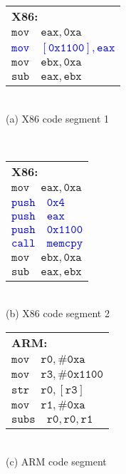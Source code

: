 \begin{figure}[tb]
\begin{minipage}{0.5\linewidth}
\centering
\scriptsize
\begin{tabular}{|l|} \hline
\textbf{X86:} \\
$\mathtt{mov\quad eax, 0xa}$\\
\textcolor{blue}{$\mathtt{mov\quad[0x1100], eax}$}\\
$\mathtt{mov\quad ebx, 0xa}$\\
$\mathtt{sub\quad eax, ebx}$ \\
\hline
\end{tabular}
\\[0.2cm] (a) X86 code segment 1 \label{fig:emulation:a}
\end{minipage}
~
\begin{minipage}{0.5\linewidth}
\centering
\scriptsize
\begin{tabular}{|l|} \hline
\textbf{X86:} \\
$\mathtt{mov\quad eax, 0xa}$\\
\textcolor{blue}{$\mathtt{push\quad 0x4}$}\\
\textcolor{blue}{$\mathtt{push\quad eax}$}\\
\textcolor{blue}{$\mathtt{push\quad 0x1100}$}\\
\textcolor{blue}{$\mathtt{call\quad memcpy}$}\\
$\mathtt{mov\quad ebx, 0xa}$ \\
$\mathtt{sub\quad eax, ebx}$ \\
\hline
\end{tabular}
\label{fig:emulation:b}
\\[0.1cm] (b) X86 code segment 2
\end{minipage}
\begin{minipage}{0.5\linewidth}
\centering
\scriptsize
\begin{tabular}{|l|} \hline
\textbf{ARM:} \\
$\mathtt{mov\quad r0, \#0xa}$\\
$\mathtt{mov\quad r3, \#0x1100}$\\
$\mathtt{str\quad  r0,[r3]}$\\
$\mathtt{mov\quad r1, \#0xa}$ \\
$\mathtt{subs\quad r0,r0,r1}$ \\
\hline
\end{tabular}
\\[0.2cm] (c)  ARM code segment \label{fig:emulation:c}
\end{minipage}
~
\begin{minipage}{0.5\linewidth}
\centering
\scriptsize
 \vspace{2mm}
 \begin{tabular}{l}


\end{tabular}
\end{minipage}
\end{figure}
